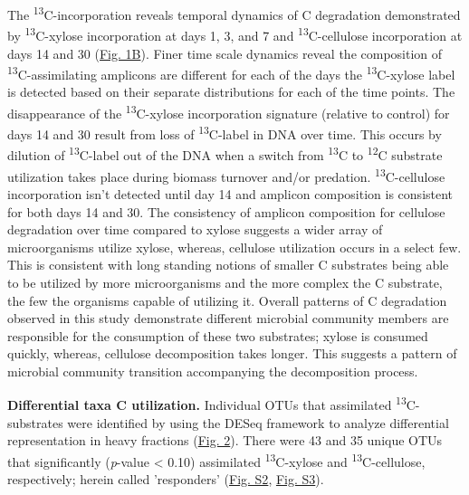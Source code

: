 The \textsuperscript{13}C-incorporation reveals temporal dynamics of C degradation demonstrated by \textsuperscript{13}C-xylose incorporation at days 1, 3, and 7 and \textsuperscript{13}C-cellulose incorporation at days 14 and 30 (\href{https://www.authorea.com/users/3537/articles/3612/master/file/figures/ordination_all1/ordination_all1.png}{Fig. 1B}). Finer time scale dynamics reveal the composition of \textsuperscript{13}C-assimilating amplicons are different for each of the days the \textsuperscript{13}C-xylose label is detected based on their separate distributions for each of the time points. The disappearance of the \textsuperscript{13}C-xylose incorporation signature (relative to control) for days 14 and 30 result from loss of \textsuperscript{13}C-label in DNA over time. This occurs by dilution of \textsuperscript{13}C-label out of the DNA when a switch from \textsuperscript{13}C to \textsuperscript{12}C substrate utilization takes place during biomass turnover and/or predation. \textsuperscript{13}C-cellulose incorporation isn't detected until day 14 and amplicon composition is consistent for both days 14 and 30.  The consistency of amplicon composition for cellulose degradation over time compared to xylose suggests a wider array of microorganisms utilize xylose, whereas, cellulose utilization occurs in a select few.  This is consistent with long standing notions of smaller C substrates being able to be utilized by more microorganisms and the more complex the C substrate, the few the organisms capable of utilizing it. Overall patterns of C degradation observed in this study demonstrate different microbial community members are responsible for the consumption of these two substrates; xylose is consumed quickly, whereas, cellulose decomposition takes longer. This suggests a pattern of microbial community transition accompanying the decomposition process. 





\textbf{Differential taxa C utilization.} Individual OTUs that assimilated \textsuperscript{13}C-substrates were identified by using the DESeq framework \cite{Anders_Huber_2010} to analyze differential representation in heavy fractions (\href{https://www.authorea.com/users/3537/articles/3612/master/file/figures/l2fc_fig1/l2fc_fig.pdf}{Fig. 2}). There were 43 and 35 unique OTUs that significantly (\textit{p}-value < 0.10) assimilated \textsuperscript{13}C-xylose and \textsuperscript{13}C-cellulose, respectively; herein called 'responders' (\href{https://www.authorea.com/users/3537/articles/8459/master/file/figures/OTU_screening_schematic/OTU_screening_schematic.pdf}{Fig. S2}, \href{https://www.authorea.com/users/3537/articles/8459/master/file/figures/l2fc_fig_pVal/l2fc_fig_pVal.png}{Fig. S3}). 

